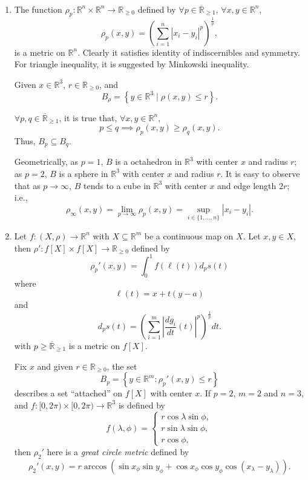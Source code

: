 \begin{example} \ 
	\begin{enumerate}
		\item The function $\rho_p: \mathbb R^n \times \mathbb R^n \to \mathbb R_{\ge 0}$ defined by $\forall p \in \overline{\mathbb R}_{\ge 1}$, $\forall x,y \in \mathbb R^n$,
			$$
			\rho_p (x,y) = \left( \sum_{i = 1}^n |x_i - y_i|^p \right)^\frac{1}{p},
			$$
			is a metric on $\mathbb R^n$. Clearly it satisfies identity of indiscernibles and symmetry. For triangle inequality, it is suggested by Minkowski inequality.
			
			Given $x \in \mathbb R^3$, $r \in \mathbb R_{\ge 0}$, and
			$$
			B_\rho = \left\{ y \in \mathbb R^3 \;|\; \rho (x,y) \le r \right\}.
			$$
			
			
			$\forall p, q \in \overline{\mathbb R}_{\ge 1}$, it is true that, $\forall x,y \in \mathbb R^n$,
			$$
			p \le q \implies \rho_p(x,y) \ge \rho_{q}(x,y).
			$$
			Thus, $B_p \subseteq B_q$.
			
			Geometrically, as $p = 1$, $B$ is a octahedron in $\mathbb R^3$ with center $x$ and radius $r$; as $p = 2$, $B$ is a sphere in $\mathbb R^3$ with center $x$ and radius $r$. It is easy to observe that as $p \to \infty$, $B$ tends to a cube in $\mathbb R^3$ with center $x$ and edge length $2r$; i.e.,
			$$
			\rho_\infty(x,y) = \lim_{p \to \infty} \rho_p (x,y) = \sup_{i \in \{1, \ldots, n\}} |x_i - y_i|.
			$$
		
		
		\item Let $f: (X, \rho) \to \mathbb R^n$ with $X \subseteq \mathbb R^m$ be a continuous map on $X$. Let $x, y \in X$, then $\rho': f[X] \times f[X] \to \mathbb R_{\ge 0}$ defined by
			$$
			\rho_p'(x,y) = \int_0^1 f(\ell(t))d_ps(t)
			$$
			where
			$$
			\ell (t) = x + t(y - a)
			$$
			and
			$$
			d_p s(t) = \left( \sum_{i = 1}^m \left|\frac{dg_i}{dt}(t)\right|^p\right)^\frac{1}{p} dt.
			$$
			with $p \ge \overline{\mathbb R}_{\ge 1}$ is a metric on $f[X]$.
			
			Fix $x$ and given $r \in \mathbb R_{\ge 0}$, the set
			$$
			B_p = \left\{ y \in \mathbb R^m : \rho_p'(x,y) \le r \right\}
			$$
			describes a set ``attached'' on $f[X]$ with center $x$.			
			If $p = 2$, $m = 2$ and $n = 3$, and $f: [0, 2 \pi) \times [0, 2 \pi) \to \mathbb R^3$ is defined by
			$$
			f(\lambda, \phi) = \begin{cases}
				r \cos \lambda \sin \phi, \\
				r \sin \lambda \sin \phi, \\
				r \cos \phi,
			\end{cases}
			$$
			then $\rho_2'$ here is a \textit{great circle metric} defined by
			$$
			\rho_2' (x,y) = r\arccos(\sin x_\phi \sin y_\phi + \cos x_\phi \cos y_\phi \cos(x_\lambda - y_\lambda)).
			$$
		

\end{enumerate}
\end{example}
